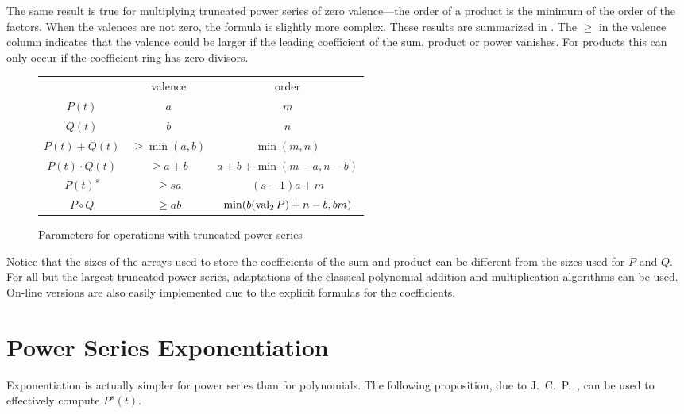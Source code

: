 The same result is true for multiplying truncated power series of zero
valence---the order of a product is the minimum of the order of the
factors.  When the valences are not zero, the formula is slightly
more complex.  These results are summarized in 
.  The $\ge$ in the valence column indicates
that the valence could be larger if the leading coefficient of the
sum, product or power vanishes.  For products this can only occur if
the coefficient ring has zero divisors.

\begin{figure}
\begin{center}
\begin{tabular}{c|c|c|}
\multicolumn{1}{c}{}& \multicolumn{1}{c}{valence} &
\multicolumn{1}{c}{order} \\ \cline{2-3}
$P(t)$ & $a$ & $m$ \\ \cline{2-3}
$Q(t)$ & $b$ & $n$ \\ \cline{2-3}
$P(t) + Q(t)$ & $\ge \min(a, b)$ & $\min(m,n)$ \\ \cline{2-3}
$P(t) \cdot Q(t)$ & $\ge a + b$ & $a + b + \min(m-a, n-b)$ \\ \cline{2-3}
$P(t)^s$ & $\ge sa$ & $(s-1) a + m$ \\ \cline{2-3}
$P\circ Q$ & $\ge ab$ & $\min(b (\mathop{\rm val}\nolimits_2 P) + n - b, bm)$ \\ \cline{2-3}
\end{tabular}
\end{center}
\caption{Parameters for operations with truncated power
series\label{TPS:Valences:Fig}} 
\end{figure}

Notice that the sizes of the arrays used to store the coefficients of
the sum and product can be different from the sizes used for $P$ and
$Q$. For all but the largest truncated power series, adaptations of the
classical polynomial addition and multiplication algorithms can be
used.  On-line versions are also easily implemented due to the explicit 
formulas for the coefficients.

\section{Power Series Exponentiation}
\label{FPS:Expt:Sec}

Exponentiation is actually simpler for power series than for
polynomials.  The following proposition, due to J.~C.~P.~{\MillerJCP},
can be used to effectively compute $P^s(t)$. 

